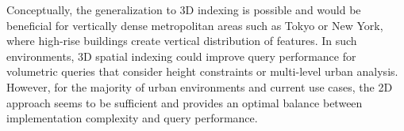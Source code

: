 Conceptually, the generalization to 3D indexing is possible and would be beneficial for vertically dense metropolitan areas such as Tokyo or New York, where high-rise buildings create vertical distribution of features. In such environments, 3D spatial indexing could improve query performance for volumetric queries that consider height constraints or multi-level urban analysis. However, for the majority of urban environments and current use cases, the 2D approach seems to be sufficient and provides an optimal balance between implementation complexity and query performance.
